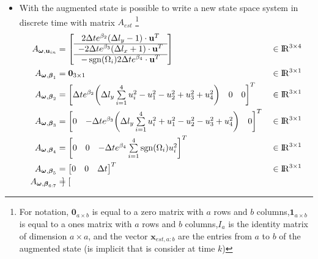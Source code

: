 \begin{itemize}
	\item With the augmented state is possible to write a new state space system in discrete time with matrix $A_{est}$ \footnote{For notation, $\mathbf{0}_{a\times b}$ is equal to a zero matrix with $a$ rows and $b$ columns,$\mathbf{1}_{a\times b}$ is equal to a ones matrix with $a$ rows and $b$ columns,$I_a$ is the identity matrix of dimension $a\times a$, and the vector $\mathbf{x}_{est,a:b}$ are the entries from $a$ to $b$ of the augmented state (is implicit that is consider at time $k$)}
	\begin{align*}
		A_{\boldsymbol{\omega}, \mathbf{u}_{in}} &= 
		\left[
		\begin{array}{c}
			2\Delta te^{\beta_2}(\Delta l_y-1)\cdot\mathbf{u}^T \\
			\hline
			-2\Delta te^{\beta_3}(\Delta l_x+1)\cdot\mathbf{u}^T \\
			\hline
			-\operatorname*{sgn}(\Omega_i)2\Delta te^{\beta_4}\cdot\mathbf{u}^T
		\end{array}
		\right] 
		& &\in \rm I\!R^{3\times 4} \\
		A_{\boldsymbol{\omega}, \boldsymbol{\beta}_1} &= \mathbf{0}_{3\times 1} & &\in \rm I\!R^{3\times 1}\\
		A_{\boldsymbol{\omega}, \boldsymbol{\beta}_{2}} &=
		\begin{bmatrix}
			\Delta te^{\beta_2}\bigg(\Delta l_y\sum\limits_{i=1}^{4}u_i^2-u_1^2-u_2^2+u_3^2+u_4^2\bigg) & 0 & 0
		\end{bmatrix}^T 
		& &\in \rm I\!R^{3\times 1}\\
		A_{\boldsymbol{\omega}, \boldsymbol{\beta}_{3}} &=
		\begin{bmatrix}
			0 & -\Delta te^{\beta_3}\bigg(\Delta l_y\sum\limits_{i=1}^{4}u_i^2+u_1^2-u_2^2-u_3^2+u_4^2\bigg) & 0
		\end{bmatrix}^T 
		& &\in \rm I\!R^{3\times 1}\\
		A_{\boldsymbol{\omega}, \boldsymbol{\beta}_{4}} &=
		\begin{bmatrix}
			0 & 0 & -\Delta te^{\beta_4}\sum\limits_{i=1}^{4}\operatorname*{sgn}(\Omega_i)u_i^2
		\end{bmatrix}^T 
		& &\in \rm I\!R^{3\times 1}\\
		A_{\boldsymbol{\omega}, \boldsymbol{\beta}_{5}} &=
		\begin{bmatrix}
			0 & 0 & \Delta t
		\end{bmatrix}^T 
		& &\in \rm I\!R^{3\times 1}\\
		A_{\boldsymbol{\omega}, \boldsymbol{\beta}_{6:7}} &=
		\begin{bmatrix}

\end{bmatrix}
\end{align*}
\end{itemize}
